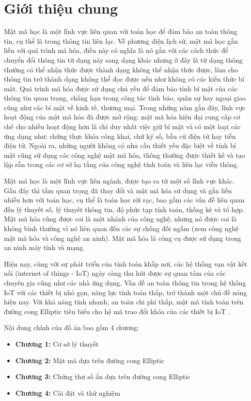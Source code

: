 \documentclass[a4paper,12pt]{report}
\begin{document}
\chapter*{Giới thiệu chung}
Mật mã học là một lĩnh vực liên quan với toán học để đảm bảo an toàn thông tin, cụ thể là trong thông tin liên lạc. Về phương diện lịch sử, mật mã học gắn liền với quá trình mã hóa, điều này có nghĩa là nó gắn với các cách thức để chuyển đổi thông tin từ dạng này sang dạng khác nhưng ở đây là từ dạng thông thường có thể nhận thức được thành dạng không thể nhận thức được, làm cho thông tin trở thành dạng không thể đọc được nếu như không có các kiến thức bí mật. Quá trình mã hóa được sử dụng chủ yếu để đảm bảo tính bí mật của các thông tin quan trọng, chẳng hạn trong công tác tình báo, quân sự hay ngoại giao cũng như các bí mật về kinh tế, thương mại.  Trong những năm gần đây, lĩnh vực hoạt động của mật mã hóa đã được mở rộng: mật mã hóa hiện đại cung cấp cơ chế cho nhiều hoạt động hơn là chỉ duy nhất việc giữ bí mật và có một loạt các ứng dụng như: chứng thực khóa công khai, chữ ký số, bầu cử điện tử hay tiền điện tử. Ngoài ra, những người không có nhu cầu thiết yếu đặc biệt về tính bí mật cũng sử dụng các công nghệ mật mã hóa, thông thường được thiết kế và tạo lập sẵn trong các cơ sở hạ tầng của công nghệ tính toán và liên lạc viễn thông. 

Mật mã học là một lĩnh vực liên ngành, được tạo ra từ một số lĩnh vực khác. Gần đây thì tầm quan trọng đã thay đổi và mật mã hóa sử dụng và gắn liền nhiều hơn với toán học, cụ thể là toán học rời rạc, bao gồm các vấn đề liên quan đến lý thuyết số, lý thuyết thông tin, độ phức tạp tính toán, thống kê và tổ hợp. Mật mã hóa cũng được coi là một nhánh của công nghệ, nhưng nó được coi là không bình thường vì nó liên quan đến các sự chống đối ngầm (xem công nghệ mật mã hóa và công nghệ an ninh). Mật mã hóa là công cụ được sử dụng trong an ninh máy tính và mạng. 

Hiện nay, cùng với sự phát triển của tính toán khắp nơi, các hệ thống vạn vật kết nối (internet of things - IoT) ngày càng thu hút được sự quan tâm của các chuyên gia cũng như các nhà ứng dụng. Vấn đề an toàn thông tin trong hệ thống IoT với các thiết bị nhỏ gọn, năng lực tính toán thấp, trở thành một chủ đề nóng hiện nay. Với khả năng tính nhanh, an toàn chi phí thấp, mật mã tính toán trên đường cong Elliptic  tiêu biểu cho hệ mã trao đổi khóa của các thiết bị IoT .

Nội dung chính của đồ án bao gồm 4 chương:
\begin{itemize}
\item \textbf{Chương 1:} Cơ sở lý thuyết
\item \textbf{Chương 2:} Mật mã dựa trên đường cong Elliptic
\item \textbf{Chương 3:} Chứng thư số ẩn dựa trên đường cong Elliptic
\item \textbf{Chương 4:} Cài đặt và thử nghiệm
\end{itemize}
\end{document}
